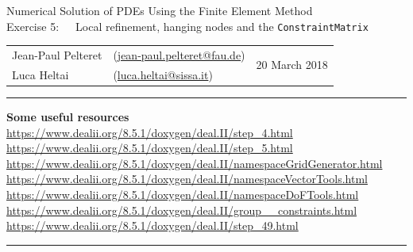 \documentclass[11pt]{exam}
\makeatletter
\newcommand{\makeheader}[3]{%
\setcounter{question}{0}
\begin{center}
{\sc Numerical Solution of PDEs Using the Finite Element Method}\vspace{2ex}\\
{\sc Exercise #1:\ \ \ #2}\vspace{2ex}\\
\begin{tabular*}{\textwidth}{ll @{\extracolsep{\fill}}r}
Jean-Paul Pelteret & (\url{jean-paul.pelteret@fau.de}) & \multirow{2}{*}{#3} \\
Luca Heltai & (\url{luca.heltai@sissa.it}) & \\
\end{tabular*}
\end{center}
}
\newcommand{\makeresources}[1]{%
\rule{\textwidth}{0.6mm}
\textbf{Some useful resources}\\[1.5ex]
#1 \par
\rule{\textwidth}{0.6mm}
}
\makeatother
\begin{document}
\begin{questions}
\end{questions}




\clearpage
\makeheader{5}{Local refinement, hanging nodes and the \texttt{ConstraintMatrix}}{20 March 2018}
\makeresources{%
\url{https://www.dealii.org/8.5.1/doxygen/deal.II/step_4.html} \\
\url{https://www.dealii.org/8.5.1/doxygen/deal.II/step_5.html} \\
\url{https://www.dealii.org/8.5.1/doxygen/deal.II/namespaceGridGenerator.html} \\
\url{https://www.dealii.org/8.5.1/doxygen/deal.II/namespaceVectorTools.html} \\
\url{https://www.dealii.org/8.5.1/doxygen/deal.II/namespaceDoFTools.html} \\
\url{https://www.dealii.org/8.5.1/doxygen/deal.II/group__constraints.html} \\
\url{https://www.dealii.org/8.5.1/doxygen/deal.II/step_49.html}
}
\end{document}
